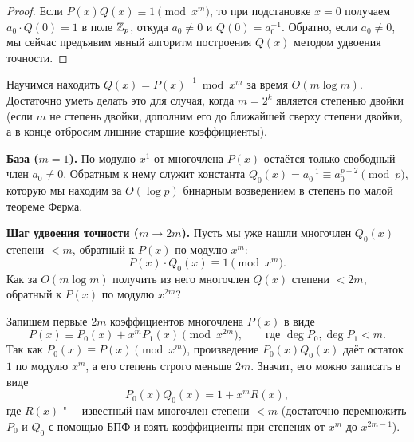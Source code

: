 \begin{proof}
    Если $P(x) Q(x) \equiv 1 \pmod{x^m}$, то при подстановке $x = 0$ получаем $a_0 \cdot Q(0) = 1$ в поле $\mathbb{Z}_p$, откуда $a_0 \ne 0$ и $Q(0) = a_0^{-1}$. Обратно, если $a_0 \ne 0$, мы сейчас предъявим явный алгоритм построения $Q(x)$ методом удвоения точности.
\end{proof}

Научимся находить $Q(x) = P(x)^{-1} \bmod x^m$ за время $O(m \log m)$. Достаточно уметь делать это для случая, когда $m = 2^k$ является степенью двойки (если $m$ не степень двойки, дополним его до ближайшей сверху степени двойки, а в конце отбросим лишние старшие коэффициенты).

\textbf{База ($m = 1$).} По модулю $x^1$ от многочлена $P(x)$ остаётся только свободный член $a_0 \ne 0$. Обратным к нему служит константа $Q_0(x) = a_0^{-1} \equiv a_0^{p - 2} \pmod p$, которую мы находим за $O(\log p)$ бинарным возведением в степень по малой теореме Ферма.

\textbf{Шаг удвоения точности ($m \to 2m$).} Пусть мы уже нашли многочлен $Q_0(x)$ степени $< m$, обратный к $P(x)$ по модулю $x^m$:
\[
    P(x) \cdot Q_0(x) \equiv 1 \pmod{x^m}.
\]
Как за $O(m \log m)$ получить из него многочлен $Q(x)$ степени $< 2m$, обратный к $P(x)$ по модулю $x^{2m}$?

Запишем первые $2m$ коэффициентов многочлена $P(x)$ в виде
\[
    P(x) \equiv P_0(x) + x^m P_1(x) \pmod{x^{2m}}, \qquad \text{где } \deg P_0, \deg P_1 < m.
\]
Так как $P_0(x) \equiv P(x) \pmod{x^m}$, произведение $P_0(x) Q_0(x)$ даёт остаток $1$ по модулю $x^m$, а его степень строго меньше $2m$. Значит, его можно записать в виде
\[
    P_0(x) Q_0(x) = 1 + x^m R(x),
\]
где $R(x)$ "--- известный нам многочлен степени $< m$ (достаточно перемножить $P_0$ и $Q_0$ с помощью БПФ и взять коэффициенты при степенях от $x^m$ до $x^{2m-1}$).

